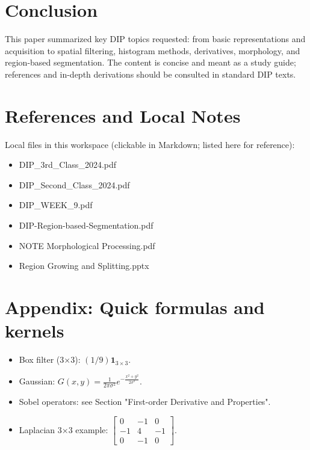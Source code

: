 \documentclass[12pt,a4paper]{article}
\begin{document}
\section{Conclusion}
This paper summarized key DIP topics requested: from basic representations and acquisition to spatial filtering, histogram methods, derivatives, morphology, and region-based segmentation. The content is concise and meant as a study guide; references and in-depth derivations should be consulted in standard DIP texts.

\section*{References and Local Notes}
Local files in this workspace (clickable in Markdown; listed here for reference):
\begin{itemize}
  \item DIP\_3rd\_Class\_2024.pdf
  \item DIP\_Second\_Class\_2024.pdf
  \item DIP\_WEEK\_9.pdf
  \item DIP-Region-based-Segmentation.pdf
  \item NOTE Morphological Processing.pdf
  \item Region Growing and Splitting.pptx
\end{itemize}

\appendix
\section{Appendix: Quick formulas and kernels}
\begin{itemize}
  \item Box filter (3×3): $(1/9)\mathbf{1}_{3\times3}$.
  \item Gaussian: $G(x,y)=\frac{1}{2\pi\sigma^2} e^{-\frac{x^2+y^2}{2\sigma^2}}$.
  \item Sobel operators: see Section "First-order Derivative and Properties".
  \item Laplacian 3×3 example: $\begin{bmatrix}0 & -1 & 0\\ -1 & 4 & -1\\ 0 & -1 & 0\end{bmatrix}$.
\end{itemize}
\end{document}
